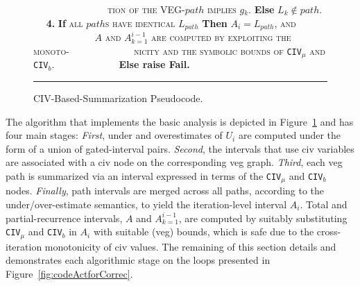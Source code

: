 \documentclass{sig-alternate}
\begin{document}
\begin{figure}[t]
\begin{small}
$\mbox{ }\mbox{ }\mbox{ }\mbox{ }\mbox{ }\mbox{ }\mbox{ }\mbox{ }\mbox{ }\mbox{ }\mbox{ }$
\textsc{tion of the VEG-$path$ implies $g_k$}. {\bf Else} $L_k \not\in path$.\vspace{2ex}\newline
$\mbox{ }\mbox{ }${\bf4.} {\bf If} \textsc{all $path$s have identical $L_{path}$} {\bf Then} $A_i = L_{path}$, \textsc{and}\vspace{1ex}\newline 
$\mbox{ }\mbox{ }\mbox{ }\mbox{ }\mbox{ }\mbox{ }\mbox{ }\mbox{ }\mbox{ }$
            \textsc{$A$ and $A_{k=1}^{i-1}$ are computed by exploiting the monoto-}\vspace{1ex}\newline 
$\mbox{ }\mbox{ }\mbox{ }\mbox{ }\mbox{ }\mbox{ }\mbox{ }\mbox{ }\mbox{ }$
\textsc{nicity and the symbolic bounds of {\tt CIV$_\mu$} {\sc and} {\tt CIV$_b$}.}\vspace{1ex}\newline
$\mbox{ }\mbox{ }\mbox{ }\mbox{ }\mbox{ }\mbox{ }\mbox{ }\mbox{ }\mbox{ }$ {\bf Else raise Fail.}\vspace{1ex}
\end{small}
\hrule
\caption{ CIV-Based-Summarization Pseudocode.}
\label{fig:BasicTechnique} %
\end{figure}


The algorithm that implements the basic analysis is depicted in 
Figure~\ref{fig:BasicTechnique} and has four main stages: 
{\em First}, under and overestimates of $U_i$ are computed under the form 
of a union of gated-interval pairs.   %
{\em Second}, the intervals that use {\sc civ} variables are 
associated with a {\sc civ} node on the corresponding {\sc veg} graph.
{\em Third}, each {\sc veg} path is summarized via an interval expressed 
in terms of the {\tt CIV$_\mu$} and {\tt CIV$_b$} nodes. 
{\em Finally}, path intervals are merged across all paths, according to 
the under/over-estimate semantics, to yield the iteration-level interval $A_i$.
Total and partial-recurrence intervals, $A$ and $A_{k=1}^{i-1}$, 
are computed by suitably substituting {\tt CIV$_\mu$} and 
{\tt CIV$_b$} in $A_i$ with suitable ({\sc veg}) bounds,
which is safe due to the cross-iteration monotonicity of {\sc civ} values.
The remaining of this section details and demonstrates each algorithmic stage
on the loops presented in Figure~\ref{fig:codeActforCorrec}.

%
%
\end{document}
